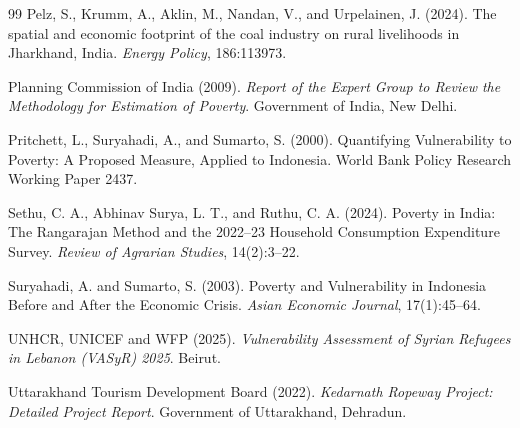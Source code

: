 \documentclass[11pt]{article}
\begin{document}
\begin{thebibliography}{99}
 Pelz, S., Krumm, A., Aklin, M., Nandan, V., and Urpelainen, J. (2024). The spatial and economic footprint of the coal industry on rural livelihoods in Jharkhand, India. \textit{Energy Policy}, 186:113973.

 Planning Commission of India (2009). \textit{Report of the Expert Group to Review the Methodology for Estimation of Poverty}. Government of India, New Delhi.

 Pritchett, L., Suryahadi, A., and Sumarto, S. (2000). Quantifying Vulnerability to Poverty: A Proposed Measure, Applied to Indonesia. World Bank Policy Research Working Paper 2437.

 Sethu, C. A., Abhinav Surya, L. T., and Ruthu, C. A. (2024). Poverty in India: The Rangarajan Method and the 2022--23 Household Consumption Expenditure Survey. \textit{Review of Agrarian Studies}, 14(2):3--22.

 Suryahadi, A. and Sumarto, S. (2003). Poverty and Vulnerability in Indonesia Before and After the Economic Crisis. \textit{Asian Economic Journal}, 17(1):45--64.

 UNHCR, UNICEF and WFP (2025). \textit{Vulnerability Assessment of Syrian Refugees in Lebanon (VASyR) 2025}. Beirut.

 Uttarakhand Tourism Development Board (2022). \textit{Kedarnath Ropeway Project: Detailed Project Report}. Government of Uttarakhand, Dehradun.

\end{thebibliography}
\end{document}

